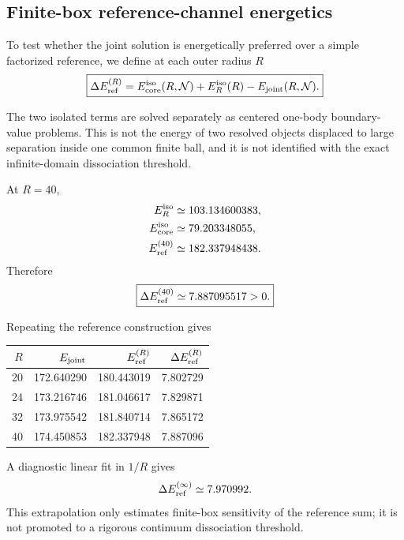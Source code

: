 \documentclass[11pt]{article}
\begin{document}
\subsection{Finite-box reference-channel energetics}

To test whether the joint solution is energetically preferred over a simple factorized reference, we define at each outer radius \(R\)
\begin{equation}
\boxed{
\Delta E_{\rm ref}^{(R)}
=
E_{\rm core}^{\rm iso}(R,\mathcal N)
+
E_{R}^{\rm iso}(R)
-
E_{\rm joint}(R,\mathcal N).
}
\end{equation}

The two isolated terms are solved separately as centered one-body boundary-value problems. This is not the energy of two resolved objects displaced to large separation inside one common finite ball, and it is not identified with the exact infinite-domain dissociation threshold.

At \(R=40\),
\begin{align}
E_R^{\rm iso}
&\simeq
103.134600383,
\\
E_{\rm core}^{\rm iso}
&\simeq
79.203348055,
\\
E_{\rm ref}^{(40)}
&\simeq
182.337948438.
\end{align}
Therefore
\begin{equation}
\boxed{
\Delta E_{\rm ref}^{(40)}
\simeq
7.887095517
>
0.
}
\end{equation}

Repeating the reference construction gives
\begin{center}
\begin{tabular}{rrrr}
\toprule
\(R\) & \(E_{\rm joint}\) & \(E_{\rm ref}^{(R)}\) & \(\Delta E_{\rm ref}^{(R)}\)\\
\midrule
20 & 172.640290 & 180.443019 & 7.802729\\
24 & 173.216746 & 181.046617 & 7.829871\\
32 & 173.975542 & 181.840714 & 7.865172\\
40 & 174.450853 & 182.337948 & 7.887096\\
\bottomrule
\end{tabular}
\end{center}

A diagnostic linear fit in \(1/R\) gives
\begin{equation}
\Delta E_{\rm ref}^{(\infty)}
\simeq
7.970992.
\end{equation}
This extrapolation only estimates finite-box sensitivity of the reference sum; it is not promoted to a rigorous continuum dissociation threshold.
\end{document}
